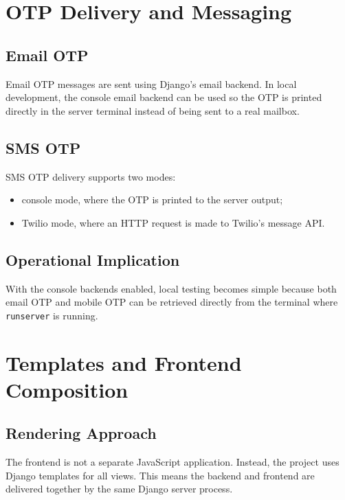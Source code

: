 \documentclass[12pt,a4paper]{article}
\begin{document}
\section{OTP Delivery and Messaging}
\subsection{Email OTP}
Email OTP messages are sent using Django's email backend. In local development, the console email backend can be used so the OTP is printed directly in the server terminal instead of being sent to a real mailbox.

\subsection{SMS OTP}
SMS OTP delivery supports two modes:
\begin{itemize}[leftmargin=1.5em]
    \item console mode, where the OTP is printed to the server output;
    \item Twilio mode, where an HTTP request is made to Twilio's message API.
\end{itemize}

\subsection{Operational Implication}
With the console backends enabled, local testing becomes simple because both email OTP and mobile OTP can be retrieved directly from the terminal where \texttt{runserver} is running.

\section{Templates and Frontend Composition}
\subsection{Rendering Approach}
The frontend is not a separate JavaScript application. Instead, the project uses Django templates for all views. This means the backend and frontend are delivered together by the same Django server process.
\end{document}
